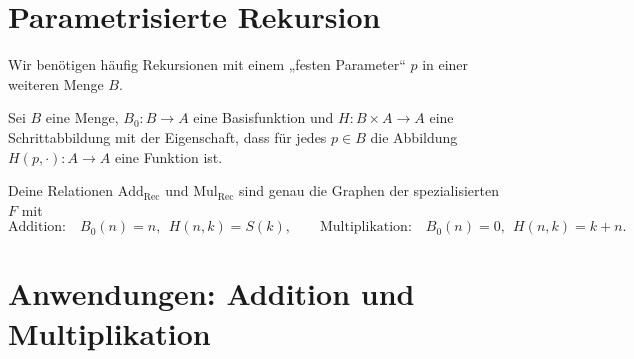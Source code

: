 \documentclass[main.tex]{subfiles}
\begin{document}
\section{Parametrisierte Rekursion}

Wir benötigen häufig Rekursionen mit einem „festen Parameter“ \(p\) in einer
weiteren Menge \(B\).

\begin{definition}
Sei \(B\) eine Menge, \(B_0:B\to A\) eine Basisfunktion und
\(H:B\times A\to A\) eine Schrittabbildung mit der Eigenschaft, dass
für jedes \(p\in B\) die Abbildung \(H(p,\cdot):A\to A\) eine Funktion ist.
\end{definition}

\begin{tabproof}
\end{tabproof}

\begin{tabproof}
\end{tabproof}

\begin{remark}
Deine Relationen \(\mathrm{Add}_{\mathrm{Rec}}\) und \(\mathrm{Mul}_{\mathrm{Rec}}\) sind genau die Graphen
der spezialisierten \(F\) mit
\[
\text{Addition:}\quad B_0(n)=n,\ \ H(n,k)=S(k),\qquad
\text{Multiplikation:}\quad B_0(n)=0,\ \ H(n,k)=k+n.
\]
\end{remark}

\section{Anwendungen: Addition und Multiplikation}
\end{document}
